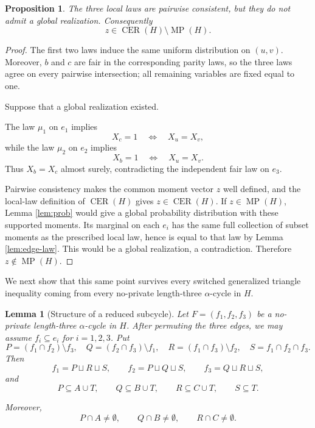 \documentclass[11pt]{article}
\newtheorem{proposition}[theorem]{Proposition}
\newtheorem{lemma}[theorem]{Lemma}
\theoremstyle{definition}
\theoremstyle{remark}
\newcommand{\MP}{\operatorname{MP}}
\newcommand{\CER}{\operatorname{CER}}
\begin{document}
\begin{editedaiblock}
\begin{proposition}\label{prop:lift-local}
The three local laws are pairwise consistent, but they do not admit a global realization. Consequently
\[
z\in\CER(H)\setminus\MP(H).
\]
\end{proposition}

\begin{proof}
The first two laws induce the same uniform distribution on $(u,v)$. Moreover, $b$ and $c$ are fair in the corresponding parity laws, so the three laws agree on every pairwise intersection; all remaining variables are fixed equal to one.

Suppose that a global realization existed. 

The law $\mu_1$ on $e_1$ implies
\[
X_c=1\quad\Longleftrightarrow\quad X_u=X_v,
\]
while the law $\mu_2$ on $e_2$ implies
\[
X_b=1\quad\Longleftrightarrow\quad X_u=X_v.
\]
Thus $X_b=X_c$ almost surely, contradicting the independent fair law on $e_3$.

Pairwise consistency makes the common moment vector $z$ well defined, and the local-law definition of $\CER(H)$ gives $z\in\CER(H)$. If $z\in\MP(H)$, Lemma \ref{lem:prob} would give a global probability distribution with these supported moments. Its marginal on each $e_i$ has the same full collection of subset moments as the prescribed local law, hence is equal to that law by Lemma \ref{lem:edge-law}. This would be a global realization, a contradiction. Therefore $z\notin\MP(H)$.
\end{proof}

We next show that this same point survives every switched generalized triangle inequality coming from every no-private length-three $\alpha$-cycle in $H$.

\begin{lemma}[Structure of a reduced subcycle]\label{lem:subcycle}
Let $F=(f_1,f_2,f_3)$ be a no-private length-three $\alpha$-cycle in $H$. After permuting the three edges, we may assume $f_i\subseteq e_i$ for $i=1,2,3$. Put
\[
P=(f_1\cap f_2)\setminus f_3,\quad
Q=(f_2\cap f_3)\setminus f_1,\quad
R=(f_1\cap f_3)\setminus f_2,\quad
S=f_1\cap f_2\cap f_3.
\]
Then
\[
f_1=P\sqcup R\sqcup S,\qquad
f_2=P\sqcup Q\sqcup S,\qquad
f_3=Q\sqcup R\sqcup S,
\]
and
\[
P\subseteq A\cup T,\qquad Q\subseteq B\cup T,\qquad
R\subseteq C\cup T,\qquad S\subseteq T.
\]

Moreover,
\[
P\cap A\neq\emptyset,\qquad
Q\cap B\neq\emptyset,\qquad
R\cap C\neq\emptyset.
\]
\end{lemma}


\end{editedaiblock}
\end{document}
